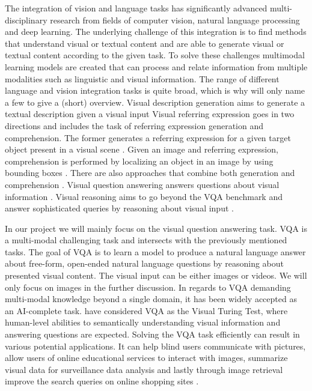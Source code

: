 \documentclass{article}
\begin{document}
The integration of vision and language tasks has significantly advanced multi-disciplinary research from fields of computer vision, natural language processing and deep learning. The underlying challenge of this integration is to find methods that understand visual or textual content and are able to generate visual or textual content according to the given task. To solve these challenges multimodal learning models are created that can process and relate information from multiple modalities such as linguistic and visual information. The range of different language and vision integration tasks is quite broad, which is why will only name a few to give a (short) overview. Visual description generation aims to generate a textual description given a visual input \citep{plummer2015vdg} Visual referring expression goes in two directions and includes the task of referring expression generation and comprehension. The former generates a referring expression for a given target object present in a visual scene \citep{fitzgerald2013learning}. Given an image and referring expression, comprehension is performed by localizing an object in an image by using bounding boxes \citep{nagaraja2016modeling}. There are also approaches that combine both generation and comprehension \citep{yu2016modeling}. Visual question answering answers questions about visual information \citep{antol2015vqa}. Visual reasoning aims to go beyond the VQA benchmark and answer sophisticated queries by reasoning about visual input \citep{johnson2017clevr}.

In our project we will mainly focus on the visual question answering task. VQA is a  multi-modal challenging task and intersects with the previously mentioned tasks. The goal of VQA is to learn a model to produce a natural language answer about free-form, open-ended natural language questions by reasoning about presented visual content. The visual input can be either images or videos. We will only focus on images in the further discussion. In regards to VQA demanding multi-modal knowledge beyond a single domain, it has been widely accepted as an AI-complete task. \cite{geman2015visual} have considered VQA as the Visual Turing Test, where human-level abilities to semantically understanding visual information and answering questions are expected. Solving the VQA task efficiently can result in various potential applications. It can help blind users communicate with pictures, allow users of online educational services to interact with images, summarize visual data for surveillance data analysis and lastly through image retrieval improve the search queries on online shopping sites \citep{manmadhan2020vqa}.
\end{document}
